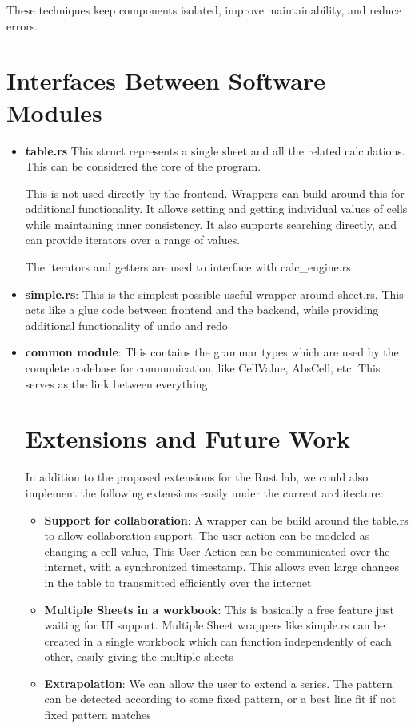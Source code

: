 \documentclass[12pt]{article}
\begin{document}
These techniques keep components isolated, improve maintainability, and reduce errors.

\section{Interfaces Between Software Modules}

\begin{itemize}
\item \textbf{table.rs} This struct represents a single sheet and all the related calculations. This can be considered the core of the program.

This is not used directly by the frontend. Wrappers can build around this for additional functionality. It allows setting and getting individual values of cells while maintaining inner consistency. It also supports searching directly, and can provide iterators over a range of values.

The iterators and getters are used to interface with calc\_engine.rs

\item \textbf{simple.rs}: This is the simplest possible useful wrapper around sheet.rs. This acts like a glue code between frontend and the backend, while providing additional functionality of undo and redo

\item \textbf{common module}: This contains the grammar types which are used by the complete codebase for communication, like CellValue, AbsCell, etc. This serves as the link between everything


\section{Extensions and Future Work}
In addition to the proposed extensions for the Rust lab, we could also implement the following extensions easily under the current architecture:
\begin{itemize}
\item \textbf{Support for collaboration}: A wrapper can be build around the table.rs to allow collaboration support. The user action can be modeled as changing a cell value, This User Action can be communicated over the internet, with a synchronized timestamp. This allows even large changes in the table to transmitted efficiently over the internet
\item \textbf{Multiple Sheets in a workbook}: This is basically a free feature just waiting for UI support. Multiple Sheet wrappers like simple.rs can be created in a single workbook which can function independently of each other, easily giving the multiple sheets
\item \textbf{Extrapolation}: We can allow the user to extend a series. The pattern can be detected according to some fixed pattern, or a best line fit if not fixed pattern matches



\end{itemize}
\end{itemize}
\end{document}
